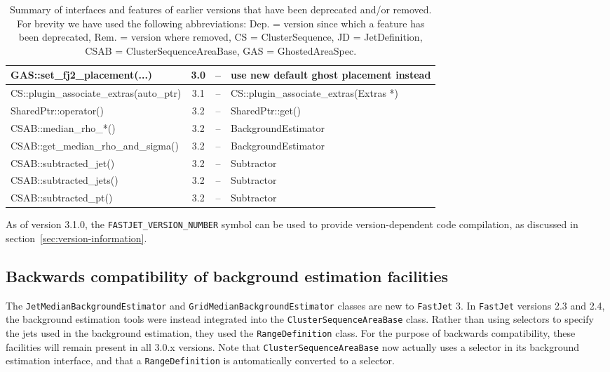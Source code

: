 \documentclass[12pt,a4]{article}
\newcommand{\fastjet}{\texttt{FastJet}\xspace}
\newcommand{\ttt}[1]{{\small\texttt{#1}}}
\begin{document}
\begin{table}
\begin{tabular}{lccl}
    GAS::set\_fj2\_placement(...)
                   & 3.0    & --   & use new default ghost placement instead\\
    \midrule %
    CS::plugin\_associate\_extras(auto\_ptr) 
                   & 3.1    &  --  &
                   CS::plugin\_associate\_extras(Extras *)\\
    \midrule %
    SharedPtr::operator()
                   & 3.2    &  --  & SharedPtr::get()\\
    CSAB::median\_rho\_*()
                   & 3.2    &  --  & BackgroundEstimator\\
    CSAB::get\_median\_rho\_and\_sigma()
                   & 3.2    &  --  & BackgroundEstimator\\ 
    CSAB::subtracted\_jet()
                   & 3.2    &  --  & Subtractor\\
    CSAB::subtracted\_jets()
                   & 3.2    &  --  & Subtractor\\
    CSAB::subtracted\_pt()
                   & 3.2    &  --  & Subtractor\\
    \bottomrule %
  \end{tabular}
  \caption{Summary of interfaces and features of earlier versions that have been
    deprecated and/or removed. For brevity we have used the following
    abbreviations: Dep. = version since which a feature has been
    deprecated, Rem. = version where removed, CS
    = ClusterSequence, JD = JetDefinition, CSAB = ClusterSequenceAreaBase, GAS =
    GhostedAreaSpec.
    \label{tab:deprecated}
  } 
\end{table}

As of version 3.1.0, the \ttt{FASTJET\_VERSION\_NUMBER} symbol can be
used to provide version-dependent code compilation, as discussed in
section~\ref{sec:version-information}. 

\subsection{Backwards compatibility of background estimation facilities}
\label{sec:BGE-backwards}

The \ttt{JetMedianBackgroundEstimator} and
\ttt{GridMedianBackgroundEstimator} classes are new to \fastjet 3.
%
In \fastjet versions 2.3 and 2.4, the background estimation tools were
instead integrated into the \ttt{ClusterSequenceAreaBase} class.
%
Rather than using selectors to specify the jets used in the background
estimation, they used the \ttt{RangeDefinition} class.
%
For the purpose of backwards compatibility, these facilities will
remain present in all 3.0.x versions.
%
Note that \ttt{ClusterSequenceAreaBase} now actually uses a selector
in its background estimation interface, and that a
\ttt{RangeDefinition} is automatically converted to a selector.
\end{document}
